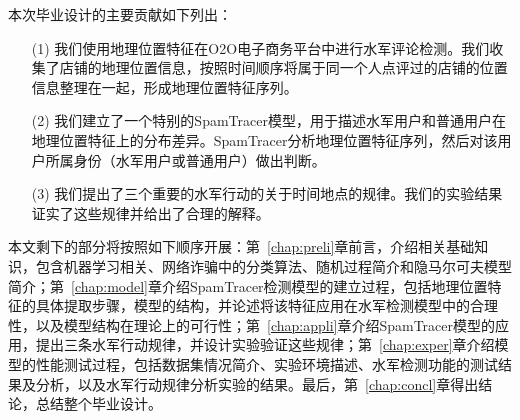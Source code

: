 本次毕业设计的主要贡献如下列出：

\begin{enumerate}
	\item[(1)] 我们使用地理位置特征在O2O电子商务平台中进行水军评论检测。我们收集了店铺的地理位置信息，按照时间顺序将属于同一个人点评过的店铺的位置信息整理在一起，形成地理位置特征序列。
	\item[(2)]  我们建立了一个特别的SpamTracer模型，用于描述水军用户和普通用户在地理位置特征上的分布差异。SpamTracer分析地理位置特征序列，然后对该用户所属身份（水军用户或普通用户）做出判断。
	\item[(3)]  我们提出了三个重要的水军行动的关于时间地点的规律。我们的实验结果证实了这些规律并给出了合理的解释。
\end{enumerate}

本文剩下的部分将按照如下顺序开展：第~\ref{chap:preli}章前言，介绍相关基础知识，包含机器学习相关、网络诈骗中的分类算法、随机过程简介和隐马尔可夫模型简介；第~\ref{chap:model}章介绍SpamTracer检测模型的建立过程，包括地理位置特征的具体提取步骤，模型的结构，并论述将该特征应用在水军检测模型中的合理性，以及模型结构在理论上的可行性；第~\ref{chap:appli}章介绍SpamTracer模型的应用，提出三条水军行动规律，并设计实验验证这些规律；第~\ref{chap:exper}章介绍模型的性能测试过程，包括数据集情况简介、实验环境描述、水军检测功能的测试结果及分析，以及水军行动规律分析实验的结果。最后，第~\ref{chap:concl}章得出结论，总结整个毕业设计。




